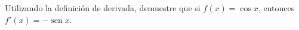 \item Utilizando la definición de derivada, demuestre que si $f(x) = \cos x$, entonces $f'(x) = -\operatorname{sen} x$.
